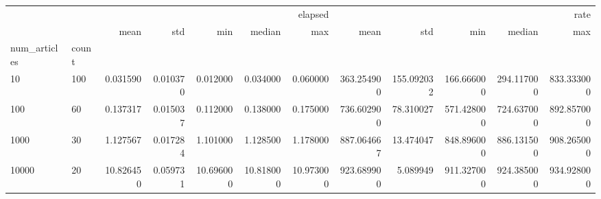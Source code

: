 \begin{tabular}{llrrrrrrrrrr}
 &  & \multicolumn{5}{r}{elapsed} & \multicolumn{5}{r}{rate} \\
 &  & mean & std & min & median & max & mean & std & min & median & max \\
num_articles & count &  &  &  &  &  &  &  &  &  &  \\
10 & 100 & 0.031590 & 0.010370 & 0.012000 & 0.034000 & 0.060000 & 363.254900 & 155.092032 & 166.666000 & 294.117000 & 833.333000 \\
100 & 60 & 0.137317 & 0.015037 & 0.112000 & 0.138000 & 0.175000 & 736.602900 & 78.310027 & 571.428000 & 724.637000 & 892.857000 \\
1000 & 30 & 1.127567 & 0.017284 & 1.101000 & 1.128500 & 1.178000 & 887.064667 & 13.474047 & 848.896000 & 886.131500 & 908.265000 \\
10000 & 20 & 10.826450 & 0.059731 & 10.696000 & 10.818000 & 10.973000 & 923.689900 & 5.089949 & 911.327000 & 924.385000 & 934.928000 \\
\end{tabular}
